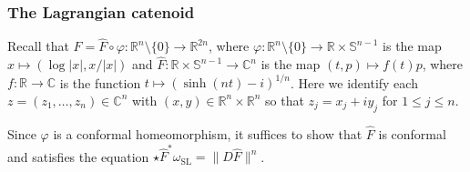 \documentclass[a4paper,leqno,11pt]{amsart}
\numberwithin{equation}{section}
\theoremstyle{remark}
\theoremstyle{remark}
\newcommand{\R}{\mathbb{R}}
\newcommand{\C}{\mathbb{C}}
\newcommand{\bS}{\mathbb{S}}
\newcommand{\SL}{\mathrm{SL}}
\begin{document}
\subsubsection{The Lagrangian catenoid}
Recall that $F = \widehat F \circ \varphi \colon \R^n\setminus \{0\} \to \R^{2n}$, where $\varphi \colon \R^n \setminus \{0\} \to \R\times \bS^{n-1}$ is the map $x\mapsto (\log |x|, x/|x|)$ and $\widehat F \colon \R\times \bS^{n-1}\to \C^n$ is the map $(t,p) \mapsto f(t)p$, where $f \colon \R\to \C$ is the function $t\mapsto (\sinh(nt)-i)^{1/n}$. Here we identify each $z = ( z_1, \dots, z_n ) \in \C^n$ with $(x,y) \in \R^n \times \R^n$ so that $z_j = x_j + i y_j$ for $1 \leq j \leq n$.

Since $\varphi$ is a conformal homeomorphism, it suffices to show that $\widehat F$ is conformal and satisfies the equation $\star \widehat F^*\omega_\SL = \| D\widehat F \|^n$.
\end{document}
